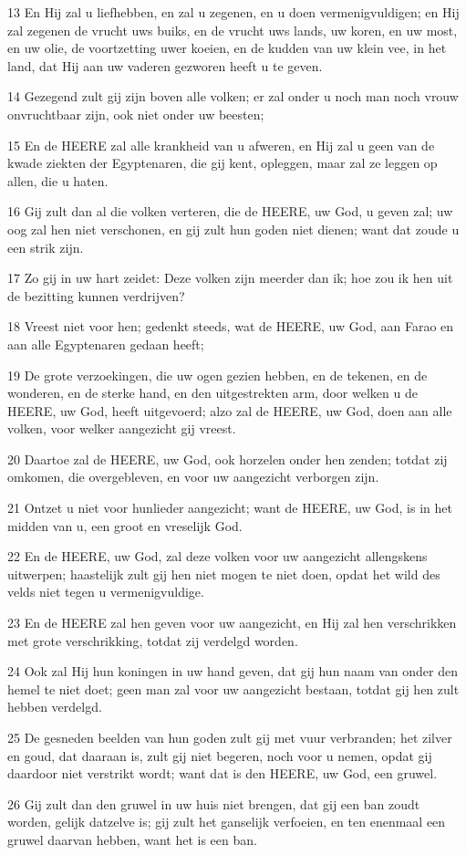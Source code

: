 \par 13 En Hij zal u liefhebben, en zal u zegenen, en u doen vermenigvuldigen; en Hij zal zegenen de vrucht uws buiks, en de vrucht uws lands, uw koren, en uw most, en uw olie, de voortzetting uwer koeien, en de kudden van uw klein vee, in het land, dat Hij aan uw vaderen gezworen heeft u te geven.
\par 14 Gezegend zult gij zijn boven alle volken; er zal onder u noch man noch vrouw onvruchtbaar zijn, ook niet onder uw beesten;
\par 15 En de HEERE zal alle krankheid van u afweren, en Hij zal u geen van de kwade ziekten der Egyptenaren, die gij kent, opleggen, maar zal ze leggen op allen, die u haten.
\par 16 Gij zult dan al die volken verteren, die de HEERE, uw God, u geven zal; uw oog zal hen niet verschonen, en gij zult hun goden niet dienen; want dat zoude u een strik zijn.
\par 17 Zo gij in uw hart zeidet: Deze volken zijn meerder dan ik; hoe zou ik hen uit de bezitting kunnen verdrijven?
\par 18 Vreest niet voor hen; gedenkt steeds, wat de HEERE, uw God, aan Farao en aan alle Egyptenaren gedaan heeft;
\par 19 De grote verzoekingen, die uw ogen gezien hebben, en de tekenen, en de wonderen, en de sterke hand, en den uitgestrekten arm, door welken u de HEERE, uw God, heeft uitgevoerd; alzo zal de HEERE, uw God, doen aan alle volken, voor welker aangezicht gij vreest.
\par 20 Daartoe zal de HEERE, uw God, ook horzelen onder hen zenden; totdat zij omkomen, die overgebleven, en voor uw aangezicht verborgen zijn.
\par 21 Ontzet u niet voor hunlieder aangezicht; want de HEERE, uw God, is in het midden van u, een groot en vreselijk God.
\par 22 En de HEERE, uw God, zal deze volken voor uw aangezicht allengskens uitwerpen; haastelijk zult gij hen niet mogen te niet doen, opdat het wild des velds niet tegen u vermenigvuldige.
\par 23 En de HEERE zal hen geven voor uw aangezicht, en Hij zal hen verschrikken met grote verschrikking, totdat zij verdelgd worden.
\par 24 Ook zal Hij hun koningen in uw hand geven, dat gij hun naam van onder den hemel te niet doet; geen man zal voor uw aangezicht bestaan, totdat gij hen zult hebben verdelgd.
\par 25 De gesneden beelden van hun goden zult gij met vuur verbranden; het zilver en goud, dat daaraan is, zult gij niet begeren, noch voor u nemen, opdat gij daardoor niet verstrikt wordt; want dat is den HEERE, uw God, een gruwel.
\par 26 Gij zult dan den gruwel in uw huis niet brengen, dat gij een ban zoudt worden, gelijk datzelve is; gij zult het ganselijk verfoeien, en ten enenmaal een gruwel daarvan hebben, want het is een ban.


